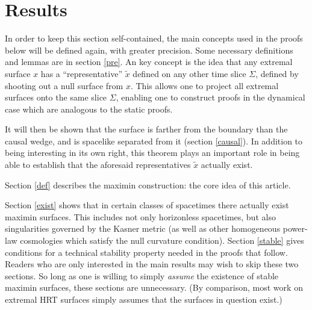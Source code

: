 \documentclass[12pt]{article}
\begin{document}


\section{Results}

In order to keep this section self-contained, the main concepts used in the proofs below will be defined again, with greater precision.  Some necessary definitions and lemmas are in section \ref{pre}.  An key concept is the idea that any extremal surface $x$ has a ``representative'' $\tilde{x}$ defined on any other time slice $\Sigma$, defined by shooting out a null surface from $x$.  This allows one to project all extremal surfaces onto the same slice $\Sigma$, enabling one to construct proofs in the dynamical case which are analogous to the static proofs.

It will then be shown that the surface is farther from the boundary than the causal wedge, and is spacelike separated from it (section \ref{causal}).  In addition to being interesting in its own right, this theorem plays an important role in being able to establish that the aforesaid representatives $\tilde{x}$ actually exist.

Section \ref{def} describes the maximin construction: the core idea of this article.

Section \ref{exist} shows that in certain classes of spacetimes there actually exist maximin surfaces.  This includes not only horizonless spacetimes, but also singularities governed by the Kasner metric (as well as other homogeneous power-law cosmologies which satisfy the null curvature condition).  Section \ref{stable} gives conditions for a technical stability property needed in the proofs that follow.  Readers who are only interested in the main results may wish to skip these two sections.  So long as one is willing to simply \emph{assume} the existence of stable maximin surfaces, these sections are unnecessary.  (By comparison, most work on extremal HRT surfaces simply assumes that the surfaces in question exist.)
\end{document}
